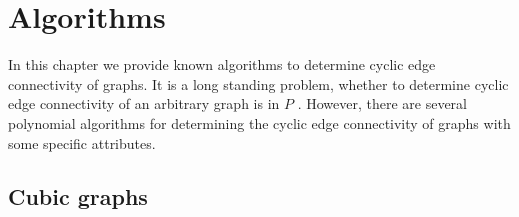 \chapter{Algorithms}\label{ch:algorithms}

In this chapter we provide known algorithms to determine cyclic edge connectivity of graphs. It is a long standing problem, whether to determine cyclic edge connectivity of an arbitrary graph is in $P$ . However, there are several polynomial algorithms for determining the cyclic edge connectivity of graphs with some specific attributes.

\section{Cubic graphs}\label{sec:cubic-graphs}

